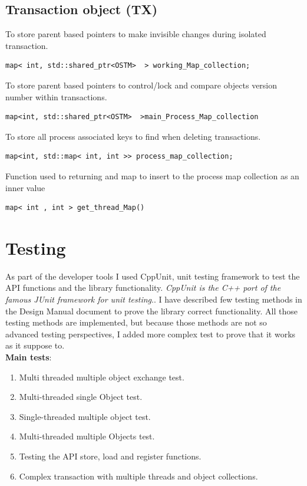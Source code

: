 \documentclass[12pt]{article}
\begin{document}
\subsection{Transaction object (TX)}
To store parent based pointers to make invisible changes during isolated transaction.
\begin{lstlisting}
map< int, std::shared_ptr<OSTM>  > working_Map_collection;
\end{lstlisting}
To store parent based pointers to control/lock and compare objects version number within transactions.
\begin{lstlisting}
map<int, std::shared_ptr<OSTM>  >main_Process_Map_collection
\end{lstlisting}
To store all process associated keys to find when deleting transactions.
\begin{lstlisting}
map<int, std::map< int, int >> process_map_collection;
\end{lstlisting}
Function used to returning and map to insert to the process map collection as an inner value
\begin{lstlisting}
map< int , int > get_thread_Map()
\end{lstlisting}
\section{Testing}
As part of the developer tools I used CppUnit, unit testing framework to test the API functions and the library functionality.  
\textit{CppUnit is the C++ port of the famous JUnit framework for unit testing}.\cite{sourceforge}\cite{cookbook}. I have described few testing methods in the Design Manual document to prove the library correct functionality. All those testing methods are implemented, but because those methods are not so advanced testing perspectives, I added more complex test to prove that it works as it suppose to.\\
\textbf{Main tests}:
\begin{enumerate}
\item Multi threaded multiple object exchange test.
\item Multi-threaded single Object test.
\item Single-threaded multiple object test.
\item Multi-threaded multiple Objects test.
\item Testing the API store, load and register functions.
\item Complex transaction with multiple threads and object collections.
\end{enumerate}
\end{document}
